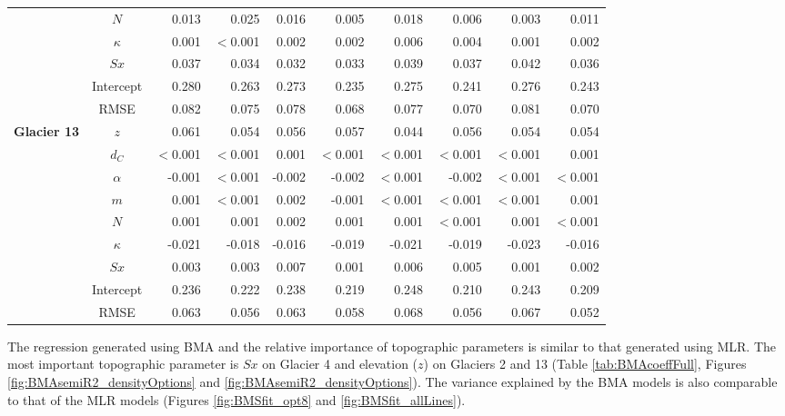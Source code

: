 \documentclass{sfuthesis}
\begin{document}
\begin{table}
\begin{tabular}{ccrrrrrrrr}
 & $N$ & 0.013 & 0.025 & 0.016 & 0.005 & 0.018 & 0.006 & 0.003 & 0.011 \\
 & $\kappa$ & 0.001 & $<$0.001 & 0.002 & 0.002 & 0.006 & 0.004 & 0.001 & 0.002 \\
 & $Sx$ & 0.037 & 0.034 & 0.032 & 0.033 & 0.039 & 0.037 & 0.042 & 0.036 \\
 & Intercept & 0.280 & 0.263 & 0.273 & 0.235 & 0.275 & 0.241 & 0.276 & 0.243 \\
 & RMSE & 0.082 & 0.075 & 0.078 & 0.068 & 0.077 & 0.070 & 0.081 & 0.070 \\ \hline
\multirow{9}{*}{\textbf{Glacier 13}} & $z$ & 0.061 & 0.054 & 0.056 & 0.057 & 0.044 & 0.056 & 0.054 & 0.054 \\
 & $d_C$ & $<$0.001 & $<$0.001 & 0.001 & $<$0.001 & $<$0.001 & $<$0.001 & $<$0.001 & 0.001 \\
 & $\alpha$ & -0.001 & $<$0.001 & -0.002 & -0.002 & $<$0.001 & -0.002 & $<$0.001 & $<$0.001 \\
 & $m$ & 0.001 & $<$0.001 & 0.002 & -0.001 & $<$0.001 & $<$0.001 & $<$0.001 & 0.001 \\
 & $N$ & 0.001 & 0.001 & 0.002 & 0.001 & 0.001 & $<$0.001 & 0.001 & $<$0.001 \\
 & $\kappa$ & -0.021 & -0.018 & -0.016 & -0.019 & -0.021 & -0.019 & -0.023 & -0.016 \\
 & $Sx$ & 0.003 & 0.003 & 0.007 & 0.001 & 0.006 & 0.005 & 0.001 & 0.002 \\
 & Intercept & 0.236 & 0.222 & 0.238 & 0.219 & 0.248 & 0.210 & 0.243 & 0.209 \\
 & RMSE & 0.063 & 0.056 & 0.063 & 0.058 & 0.068 & 0.056 & 0.067 & 0.052
\end{tabular}
\end{table}

The regression generated using BMA and the relative importance of topographic parameters is similar to that generated using MLR. The most important topographic parameter is $Sx$ on Glacier 4 and elevation ($z$) on Glaciers 2 and 13 (Table \ref{tab:BMAcoeffFull}, Figures \ref{fig:BMAsemiR2_densityOptions} and \ref{fig:BMAsemiR2_densityOptions}). The variance explained by the BMA models is also comparable to that of the MLR models (Figures \ref{fig:BMSfit_opt8} and \ref{fig:BMSfit_allLines}). 
\end{document}
